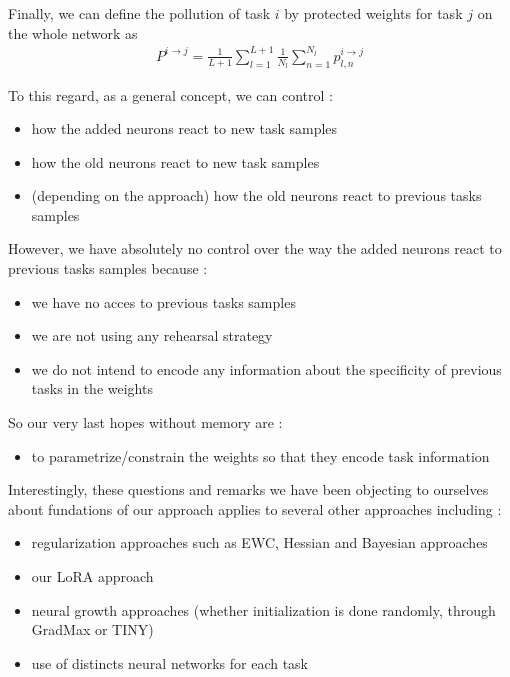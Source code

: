 \documentclass{article}
\begin{document}
\noindent
Finally, we can define the pollution of task $i$ by protected weights for task $j$ on the whole network as
\begin{align}
    P^{i\rightarrow j} = \frac{1}{L+1}\sum_{l=1}^{L+1}{\frac{1}{N_l}\sum_{n=1}^{N_l}{p_{l,n}^{i\rightarrow j}}}
\end{align}

\vspace{0.5cm}

\noindent
To this regard, as a general concept, we can control :
\begin{itemize}
    \item how the added neurons react to new task samples
    \item how the old neurons react to new task samples
    \item (depending on the approach) how the old neurons react to previous tasks samples
\end{itemize}

However, we have absolutely no control over the way the added neurons react to previous tasks samples because :
\begin{itemize}
    \item we have no acces to previous tasks samples
    \item we are not using any rehearsal strategy
    \item we do not intend to encode any information about the specificity of previous tasks in the weights 
\end{itemize}

So our very last hopes without memory are :
\begin{itemize}
    \item to parametrize/constrain the weights so that they encode task information
\end{itemize}

Interestingly, these questions and remarks we have been objecting to ourselves about fundations of our approach applies to several other approaches including :
\begin{itemize}
    \item regularization approaches such as EWC, Hessian and Bayesian approaches
    \item our LoRA approach
    \item neural growth approaches (whether initialization is done randomly, through GradMax or TINY)
    \item use of distincts neural networks for each task
\end{itemize}
\end{document}
